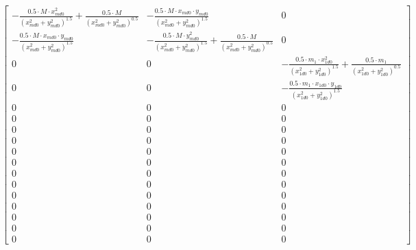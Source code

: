 $$\left[\begin{matrix}- \frac{0.5 \cdot M \cdot x_{m d 0}^{2}}{\left(x_{m d 0}^{2} + y_{m d 0}^{2}\right)^{1.5}} + \frac{0.5 \cdot M}{\left(x_{m d 0}^{2} + y_{m d 0}^{2}\right)^{0.5}} & - \frac{0.5 \cdot M \cdot x_{m d 0} \cdot y_{m d 0}}{\left(x_{m d 0}^{2} + y_{m d 0}^{2}\right)^{1.5}} & 0\\- \frac{0.5 \cdot M \cdot x_{m d 0} \cdot y_{m d 0}}{\left(x_{m d 0}^{2} + y_{m d 0}^{2}\right)^{1.5}} & - \frac{0.5 \cdot M \cdot y_{m d 0}^{2}}{\left(x_{m d 0}^{2} + y_{m d 0}^{2}\right)^{1.5}} + \frac{0.5 \cdot M}{\left(x_{m d 0}^{2} + y_{m d 0}^{2}\right)^{0.5}} & 0\\0 & 0 & - \frac{0.5 \cdot m_{1} \cdot x_{1 d 0}^{2}}{\left(x_{1 d 0}^{2} + y_{1 d 0}^{2}\right)^{1.5}} + \frac{0.5 \cdot m_{1}}{\left(x_{1 d 0}^{2} + y_{1 d 0}^{2}\right)^{0.5}}\\0 & 0 & - \frac{0.5 \cdot m_{1} \cdot x_{1 d 0} \cdot y_{1 d 0}}{\left(x_{1 d 0}^{2} + y_{1 d 0}^{2}\right)^{1.5}}\\0 & 0 & 0\\0 & 0 & 0\\0 & 0 & 0\\0 & 0 & 0\\0 & 0 & 0\\0 & 0 & 0\\0 & 0 & 0\\0 & 0 & 0\\0 & 0 & 0\\0 & 0 & 0\\0 & 0 & 0\\0 & 0 & 0\\0 & 0 & 0\end{matrix}\right]$$


